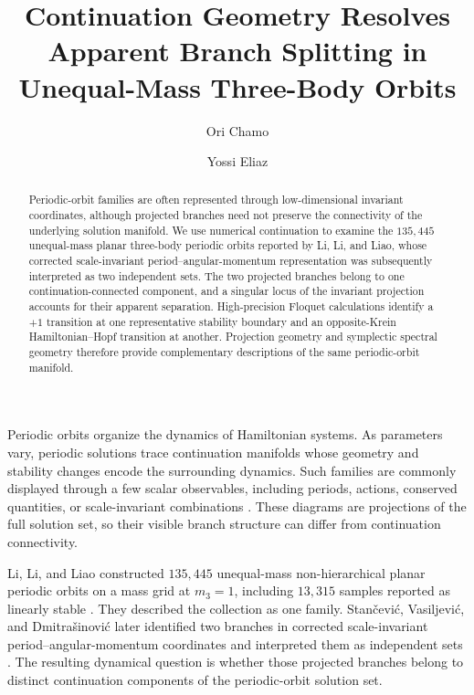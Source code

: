 \documentclass[aps,prl,reprint,amsmath,amssymb]{revtex4-2}
\begin{document}
\title{Continuation Geometry Resolves Apparent Branch Splitting in Unequal-Mass Three-Body Orbits}

\author{Ori Chamo}

\author{Yossi Eliaz}

\begin{abstract}
Periodic-orbit families are often represented through low-dimensional invariant
coordinates, although projected branches need not preserve the connectivity of
the underlying solution manifold. We use numerical continuation to examine the
$135{,}445$ unequal-mass planar three-body periodic orbits reported by Li, Li,
and Liao, whose corrected scale-invariant period--angular-momentum
representation was subsequently interpreted as two independent sets. The two
projected branches belong to one continuation-connected component, and a
singular locus of the invariant projection accounts for their apparent
separation. High-precision Floquet calculations identify a $+1$ transition at
one representative stability boundary and an opposite-Krein
Hamiltonian--Hopf transition at another. Projection geometry and symplectic
spectral geometry therefore provide complementary descriptions of the same
periodic-orbit manifold.
\end{abstract}

\maketitle

Periodic orbits organize the dynamics of Hamiltonian systems. As parameters
vary, periodic solutions trace continuation manifolds whose geometry and
stability changes encode the surrounding dynamics. Such families are commonly
displayed through a few scalar observables, including periods, actions,
conserved quantities, or scale-invariant combinations
\cite{chenciner2000figureeight,galan2002figureeight,li2025review}. These diagrams
are projections of the full solution set, so their visible branch structure can
differ from continuation connectivity.

Li, Li, and Liao constructed $135{,}445$ unequal-mass non-hierarchical planar
periodic orbits on a mass grid at $m_3=1$, including $13{,}315$ samples reported
as linearly stable \cite{li2021stable}. They described the collection as one
family. Stan{\v c}evi{\'c}, Vasiljevi{\'c}, and Dmitra{\v s}inovi{\'c} later
identified two branches in corrected scale-invariant period--angular-momentum
coordinates and interpreted them as independent sets
\cite{stancevic2023moth}. The resulting dynamical question is whether those
projected branches belong to distinct continuation components of the
periodic-orbit solution set.
\end{document}
